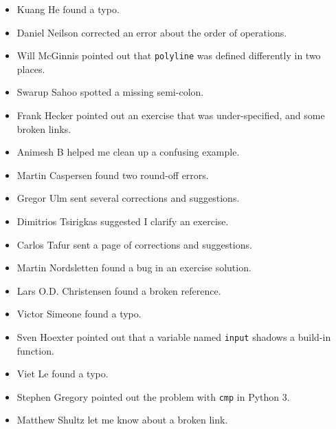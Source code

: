 \documentclass[10pt]{book}
\begin{document}
\begin{itemize}
\item Kuang He found a typo.

\item Daniel Neilson corrected an error about the order of operations.

\item Will McGinnis pointed out that {\tt polyline} was defined
differently in two places.

\item Swarup Sahoo spotted a missing semi-colon.

\item Frank Hecker pointed out an exercise that was under-specified, and
some broken links.

\item Animesh B helped me clean up a confusing example.

\item Martin Caspersen found two round-off errors.

\item Gregor Ulm sent several corrections and suggestions.

\item Dimitrios Tsirigkas suggested I clarify an exercise.

\item Carlos Tafur sent a page of corrections and suggestions.

\item Martin Nordsletten found a bug in an exercise solution.

\item Lars O.D. Christensen found a broken reference.

\item Victor Simeone found a typo.

\item Sven Hoexter pointed out that a variable named {\tt input}
shadows a build-in function.

\item Viet Le found a typo.

\item Stephen Gregory pointed out the problem with {\tt cmp}
in Python 3.

\item Matthew Shultz let me know about a broken link.


\end{itemize}

\normalsize
\clearemptydoublepage
\end{document}
